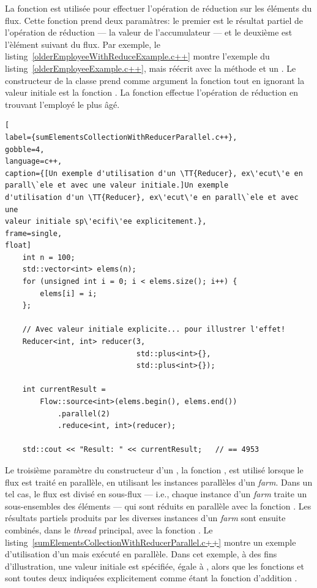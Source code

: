 La fonction  est utilis\'ee pour effectuer l'op\'eration de r\'eduction sur les éléments du flux. Cette fonction prend deux paramàtres: le premier est le r\'esultat partiel de l'op\'eration de r\'eduction  --- la valeur de l'accumulateur --- et le deuxi\`eme est l'\`el\'ement suivant du flux. Par exemple, le listing~\ref{olderEmployeeWithReduceExample.c++} montre l'exemple du listing~\ref{olderEmployeeExample.c++}, mais r\'e\'ecrit avec la m\'ethode  et un . Le constructeur de la classe  prend comme argument la fonction  tout en ignorant la valeur initiale est la fonction . La fonction  effectue l'op\'eration de r\'eduction en trouvant l'employ\'e le plus \^ag\'e. 


\begin{lstlisting}[
label={sumElementsCollectionWithReducerParallel.c++},
gobble=4,
language=c++,
caption={[Un exemple d'utilisation d'un \TT{Reducer}, ex\'ecut\'e en
parall\`ele et avec une valeur initiale.]Un exemple
d'utilisation d'un \TT{Reducer}, ex\'ecut\'e en parall\`ele et avec une
valeur initiale sp\'ecifi\'ee explicitement.},
frame=single,
float]
    int n = 100;
    std::vector<int> elems(n);
    for (unsigned int i = 0; i < elems.size(); i++) {
        elems[i] = i;
    };

    // Avec valeur initiale explicite... pour illustrer l'effet!
    Reducer<int, int> reducer(3, 
                              std::plus<int>{}, 
                              std::plus<int>{});

	int currentResult =
		Flow::source<int>(elems.begin(), elems.end())
            .parallel(2)
            .reduce<int, int>(reducer); 
	
	std::cout << "Result: " << currentResult;	// == 4953
\end{lstlisting}


Le troisi\`eme param\`etre du constructeur d'un , la fonction , est utilis\'e lorsque le flux est trait\'e en parall\`ele, en utilisant les instances parall\`eles d'un \emph{farm}. Dans un tel cas, le flux est divis\'e en sous-flux --- i.e., chaque instance d'un \emph{farm} traite un sous-ensembles des éléments --- qui sont r\'eduits en parall\`ele avec la fonction . Les r\'esultats partiels produits par les diverses instances d'un \emph{farm} sont ensuite combin\'es, dans le \emph{thread} principal, avec la fonction . Le listing~\ref{sumElementsCollectionWithReducerParallel.c++} montre un exemple d'utilisation d'un  mais ex\'ecut\'e en parall\`ele. Dans cet exemple, \`a des fins d'illustration, une valeur initiale est sp\'ecifi\'ee, \'egale \`a , alors que les fonctions  et  sont toutes deux indiqu\'ees explicitement comme \'etant la fonction d'addition . 


